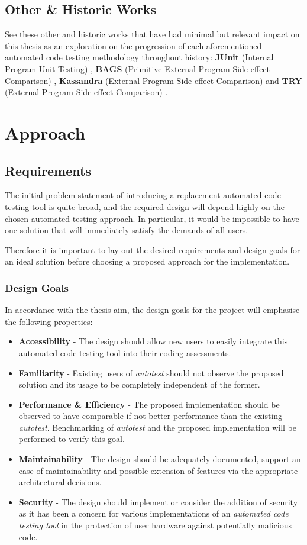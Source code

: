 \documentclass[hidelinks]{report}
\newcommand{\unchapter}[2]{
    \setcounter{chapter}{#1}
    \setcounter{section}{0}
    \chapter*{#2}
    \addcontentsline{toc}{chapter}{#2}
}
\begin{document}
\section{Other \& Historic Works}
See these other and historic works that have had minimal but relevant impact on this thesis as an exploration on the progression of each aforementioned automated code testing methodology throughout history: \textbf{JUnit} (Internal Program Unit Testing) \cite{junit}, \textbf{BAGS} (Primitive External Program Side-effect Comparison) \cite{bags}, \textbf{Kassandra} (External Program Side-effect Comparison) \cite{kassandra} and \textbf{TRY} (External Program Side-effect Comparison) \cite{try}. 

\unchapter{4}{Approach}

\section{Requirements}

The initial problem statement of introducing a replacement automated code testing tool is quite broad, and the required design will depend highly on the chosen automated testing approach. In particular, it would be impossible to have one solution that will immediately satisfy the demands of all users.

Therefore it is important to lay out the desired requirements and design goals for an ideal solution before choosing a proposed approach for the implementation.

\subsection{Design Goals}

In accordance with the thesis aim, the design goals for the project will emphasise the following properties:

\begin{itemize}
	\item \textbf{Accessibility} - The design should allow new users to easily integrate this automated code testing tool into their coding assessments.
	\item \textbf{Familiarity} - Existing users of \textit{autotest} should not observe the proposed solution and its usage to be completely independent of the former.
	\item \textbf{Performance \& Efficiency} - The proposed implementation should be observed to have comparable if not better performance than the existing \textit{autotest}. Benchmarking of \textit{autotest} and the proposed implementation will be performed to verify this goal.
	\item \textbf{Maintainability} - The design should be adequately documented, support an ease of maintainability and possible extension of features via the appropriate architectural decisions.
	\item \textbf{Security} - The design should implement or consider the addition of security as it has been a concern for various implementations of an \textit{automated code testing tool} in the protection of user hardware against potentially malicious code.
\end{itemize}
\end{document}
